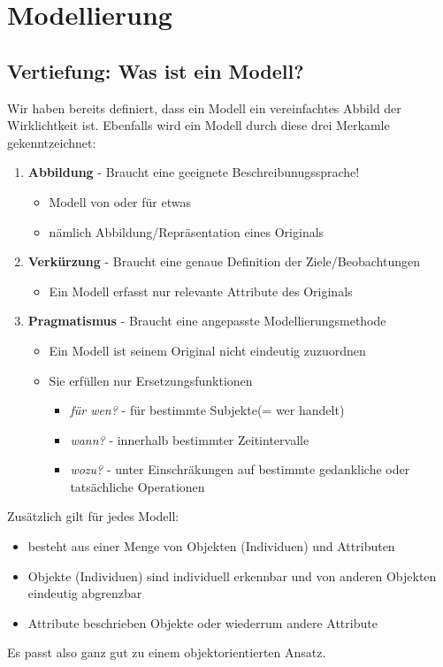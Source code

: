 \section{Modellierung}
\subsection{Vertiefung: Was ist ein Modell?}
Wir haben bereits definiert, dass ein Modell ein vereinfachtes Abbild der Wirklichtkeit ist.
Ebenfalls wird ein Modell durch diese drei Merkamle gekenntzeichnet:
\begin{enumerate}
    \item \textbf{Abbildung} - Braucht eine geeignete Beschreibunugssprache!
    \begin{itemize}
        \item Modell von oder für etwas
        \item nämlich Abbildung/Repräsentation eines Originals
    \end{itemize}
    \item \textbf{Verkürzung} - Braucht eine genaue Definition der Ziele/Beobachtungen
    \begin{itemize}
        \item Ein Modell erfasst nur relevante Attribute des Originals
    \end{itemize}
      \item \textbf{Pragmatismus} - Braucht eine angepasste Modellierungsmethode
    \begin{itemize}
        \item Ein Modell ist seinem Original nicht eindeutig zuzuordnen
        \item Sie erfüllen nur Ersetzungsfunktionen
        \begin{itemize}
            \item \textit{für wen?} - für bestimmte Subjekte(= wer handelt) 
            \item \textit{wann?} - innerhalb bestimmter Zeitintervalle
            \item \textit{wozu?} - unter Einschräkungen auf bestimmte gedankliche oder tatsächliche Operationen
        \end{itemize}
    \end{itemize}
\end{enumerate}

Zusätzlich gilt für jedes Modell:
\begin{itemize}
    \item besteht aus einer Menge von Objekten (Individuen) und Attributen
    \item Objekte (Individuen) sind individuell erkennbar und von anderen Objekten eindeutig abgrenzbar
    \item Attribute beschrieben Objekte oder wiederrum andere Attribute
\end{itemize}
Es passt also ganz gut zu einem objektorientierten Ansatz.

